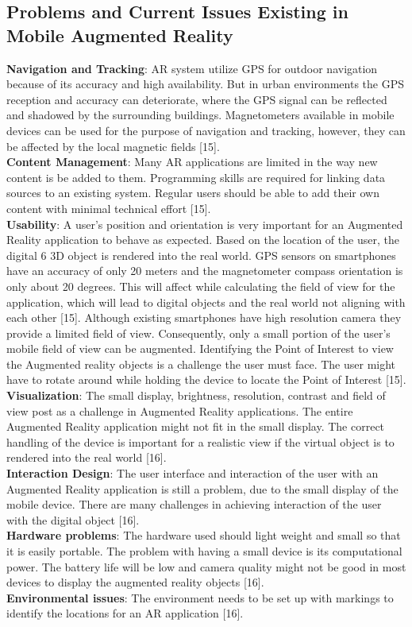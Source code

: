 \subsection{Problems and Current Issues Existing in Mobile Augmented Reality }
 \textbf{Navigation and Tracking}: AR system utilize GPS for outdoor navigation because of 
its accuracy and high availability. But in urban environments the GPS reception and 
accuracy can deteriorate, where the GPS signal can be reflected and shadowed by the 
surrounding buildings. Magnetometers available in mobile devices can be used for the 
purpose of navigation and tracking, however, they can be affected by the local magnetic 
fields [15]. 
\\\textbf{Content Management}: Many AR applications are limited in the way new content is 
be added to them. Programming skills are required for linking data sources to an existing 
system. Regular users should be able to add their own content with minimal technical 
effort [15]. 
\\\textbf{Usability}: A user’s position and orientation is very important for an Augmented 
Reality application to behave as expected. Based on the location of the user, the digital 
6 
3D object is rendered into the real world. GPS sensors on smartphones have an accuracy 
of only 20 meters and the magnetometer compass orientation is only about 20 degrees. 
This will affect while calculating the field of view for the application, which will lead to 
digital objects and the real world not aligning with each other [15]. 
    Although existing smartphones have high resolution camera they provide a limited 
field of view. Consequently, only a small portion of the user’s mobile field of view can 
be augmented. Identifying the Point of Interest to view the Augmented reality objects is a 
challenge the user must face. The user might have to rotate around while holding the 
device to locate the Point of Interest [15]. 
 \\\textbf{Visualization}: The small display, brightness, resolution, contrast and field of view 
post as a challenge in Augmented Reality applications. The entire Augmented Reality 
application might not fit in the small display. The correct handling of the device is 
important for a realistic view if the virtual object is to rendered into the real world [16]. 
  \\\textbf{Interaction Design}: The user interface and interaction of the user with an Augmented 
Reality application is still a problem, due to the small display of the mobile device. There 
are many challenges in achieving interaction of the user with the digital object [16]. 
 \\\textbf{Hardware problems}: The hardware used should light weight and small so that it is 
easily portable. The problem with having a small device is its computational power. The 
battery life will be low and camera quality might not be good in most devices to display 
the augmented reality objects [16]. 
  \\\textbf{Environmental issues}: The environment needs to be set up with markings to identify 
the locations for an AR application [16]. 
